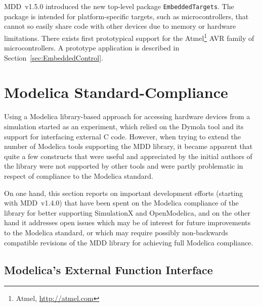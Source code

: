 \documentclass{resources/modelica}
\newcommand{\modelica}[1]{\lstinline[language=modelica]|#1|}
\newcommand{\BTHI}[1]{}
\begin{document}
MDD~v1.5.0 introduced the new top-level package \modelica{EmbeddedTargets}. The
package is intended for platform-specific targets, such as microcontrollers,
that cannot so easily share code with other devices due to memory or hardware
limitations.
There exists first prototypical support for the
Atmel\footnote{Atmel, \url{http://atmel.com}} AVR family of
microcontrollers. A prototype application is described in
Section~\ref{sec:EmbeddedControl}.

\section{Modelica Standard-Compliance}
\label{sec:ModelicaStandardCompliance}
\BTHI{TODO: Thomas, Bernhard}

Using a Modelica library-based approach for accessing hardware devices from a
simulation started as an experiment, which relied on the Dymola tool and its
support for interfacing external C code.
However, when trying to extend the number
of Modelica tools supporting the MDD library, it became apparent that quite a
few constructs that were useful and appreciated by the initial authors of the
library were not supported by other tools and were partly problematic in respect
of compliance to the Modelica standard.

On one hand, this section reports on
important development efforts (starting with MDD~v1.4.0) that have been spent on the
Modelica compliance of the library for better supporting SimulationX and
OpenModelica, and on the other hand it addresses open issues which may
be of interest for future improvements to the Modelica standard, or which
may require possibly non-backwards compatible revisions of the MDD library for
achieving full Modelica compliance.

\subsection{Modelica's External Function Interface}
\end{document}
